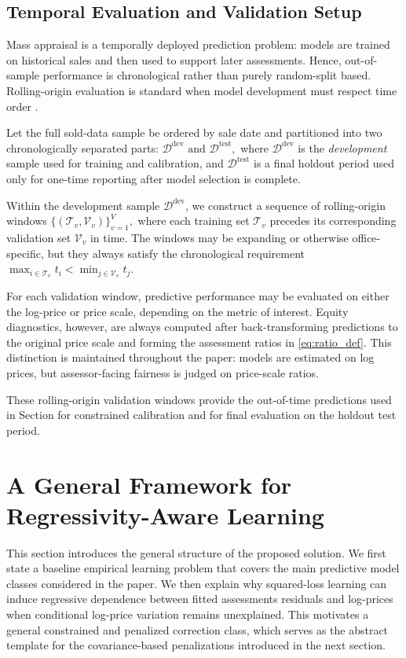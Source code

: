 \documentclass[12pt, draft]{article}
\theoremstyle{plain}
\theoremstyle{definition}
\newcommand{\1}{\mathbf{1}}
\begin{document}
{\subsection{Temporal Evaluation and Validation Setup}
\label{subsec:oos_protocol}

Mass appraisal is a temporally deployed prediction problem: models are trained on historical sales and then used to support later assessments. Hence, out-of-sample performance is chronological rather than purely random-split based. Rolling-origin evaluation is standard when model development must respect time order \cite{tashman2000out}.

Let the full sold-data sample be ordered by sale date and partitioned into two chronologically separated parts:
$
\mathcal D^{\mathrm{dev}}
\text{ and }
\mathcal D^{\mathrm{test}},
$
where $\mathcal D^{\mathrm{dev}}$ is the \emph{development} sample used for training and calibration, and $\mathcal D^{\mathrm{test}}$ is a final holdout period used only for one-time reporting after model selection is complete.

Within the development sample $\mathcal D^{\mathrm{dev}}$, we construct a sequence of rolling-origin windows
$
\{(\mathcal T_v,\mathcal V_v)\}_{v=1}^V,
$
where each training set $\mathcal T_v$ precedes its corresponding validation set $\mathcal V_v$ in time. The windows may be expanding or otherwise office-specific, but they always satisfy the chronological requirement
$
\max_{i\in \mathcal T_v} t_i
<
\min_{j\in \mathcal V_v} t_j.
$

For each validation window, predictive performance may be evaluated on either the log-price or price scale, depending on the metric of interest. Equity diagnostics, however, are always computed after back-transforming predictions to the original price scale and forming the assessment ratios in \eqref{eq:ratio_def}. This distinction is maintained throughout the paper: models are estimated on log prices, but assessor-facing fairness is judged on price-scale ratios.

These rolling-origin validation windows provide the out-of-time predictions used in Section for constrained calibration and for final evaluation on the holdout test period.

\section{A General Framework for Regressivity-Aware Learning}


This section introduces the general structure of the proposed solution. We first state a baseline empirical learning problem that covers the main predictive model classes considered in the paper. We then explain why squared-loss learning can induce regressive dependence between fitted assessments residuals and log-prices when conditional log-price variation remains unexplained. This motivates a general constrained and penalized correction class, which serves as the abstract template for the covariance-based penalizations introduced in the next section.

}
\end{document}
